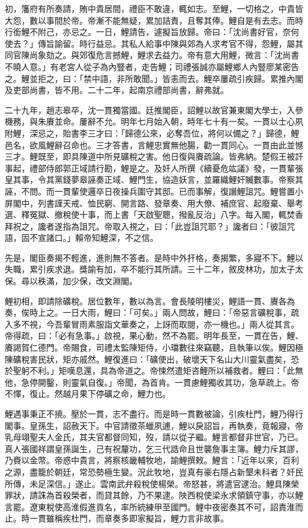 \begin{pinyinscope}
初，籓府有所奏請，賄中貴居間，禮臣不敢違，輒如志。至鯉，一切格之，中貴皆大怨，數以事間於帝。帝漸不能無疑，累加詰責，且奪其俸。鯉自是有去志。而時行銜鯉不附己，亦忌之。一日，鯉請告，遽擬旨放歸。帝曰：「沈尚書好官，奈何使去？」傳旨諭留。時行益忌。其私人給事中陳與郊為人求考官不得，怨鯉，屬其同官陳尚象劾之。與郊復危言撼鯉，鯉求去益力。帝有意大用鯉，微言：「沈尚書不曉人意。」有老宮人從子為內豎者，走告鯉；司禮張誠亦屬鯉鄉人內豎廖某密告之。鯉並拒之，曰：「禁中語，非所敢聞。」皆恚而去。鯉卒屢疏引疾歸。累推內閣及吏部尚書，皆不用。二十二年，起南京禮部尚書，辭弗就。

二十九年，趙志皋卒，沈一貫獨當國。廷推閣臣，詔鯉以故官兼東閣大學士，入參機務，與朱賡並命。屢辭不允。明年七月始入朝，時年七十有一矣。一貫以士心夙附鯉，深忌之，貽書李三才曰：「歸德公來，必奪吾位，將何以備之？」歸德，鯉邑名，欲風鯉辭召命也。三才答書，言鯉忠實無他腸，勸一貫同心。一貫由此並憾三才。鯉既至，即具陳道中所見礦稅之害。他日復與賡疏論。皆弗納。楚假王被訐事起，禮部侍郎郭正域請行勘，鯉是之。及奸人所撰《續憂危竑議》發，一貫輩張皇其事，令其黨錢夢皋誣奏正域、鯉門生，協造妖言，並羅織鯉奸贓數事。帝察其誣，不問。而一貫輩使邏卒日夜操兵圍守其邸。已而事解，復譖鯉詛咒。鯉嘗置小屏閣中，列書謹天戒、恤民窮、開言路、發章奏、用大僚、補庶官、起廢棄、舉考選、釋冤獄、撤稅使十事，而上書「天啟聖聰，撥亂反治」八字。每入閣，輒焚香拜祝之，讒者遂指為詛咒。帝取入視之，曰：「此豈詛咒耶？」讒者曰：「彼詛咒語，固不宣諸口。」賴帝知鯉深，不之信。

先是，閣臣奏揭不輕進，進則無不答者。是時中外扞格，奏揭繁，多寢不下。鯉以失職，累引疾求退。獎諭有加，卒不能行其所請。三十二年，敘皮林功，加太子太保。尋以秩滿，加少保，改文淵閣。

鯉初相，即請除礦稅。居位數年，數以為言。會長陵明樓災，鯉語一貫、賡各為奏，俟時上之。一日大雨，鯉曰：「可矣。」兩人問故，鯉曰：「帝惡言礦稅事，疏入多不視，今吾輩冒雨素服詣文華奏之，上訝而取閱，亦一機也。」兩人從其言。帝得疏，曰：「必有急事。」啟視，果心動，然不為罷。明年長至，一貫在告，鯉、賡謁賀仁德門。帝賜食，司禮太監陳矩侍，小璫數往來竊聽，且執筆以俟。鯉因極陳礦稅害民狀，矩亦戚然。鯉復進曰：「礦使出，破壞天下名山大川靈氣盡矣，恐於聖躬不利。」矩嘆息還，具為帝道之。帝悚然遣矩咨鯉所以補救者。鯉曰：「此無他，急停開鑿，則靈氣自復。」帝聞，為首肯。一貫慮鯉獨收其功，急草疏上。帝不懌，復止。然越月果下停礦之命，鯉力也。

鯉遇事秉正不撓。壓於一貫，志不盡行。而是時一貫數被論，引疾杜門，鯉乃得行閣事。皇孫生，詔赦天下。中官請徵茶蠟夙逋，鯉以戾詔旨，再執奏，竟報寢，帝乳母翊聖夫人金氏，其夫官都督同知，歿，請以從子繼。鯉言都督非世官，乃已。真人張國祥謂皇孫誕生，己有祝釐功，乞三代誥命且世襲詹事主簿。鯉力斥其謬，乃賚以金幣。帝惑中貴言，將察核畿輔牧地，諭鯉撰敕。鯉言：「近年以來，百利之源，盡籠於朝廷，常恐勢極生變。況此牧地，豈真有豪右隱占新墾未科者？奸民所傳，未足深信。」遂止。雲南武弁殺稅使楊榮。帝怒甚，將遣官逮治。鯉具陳榮罪狀，請誅為首殺榮者，而貸其餘，乃不果逮。陜西稅使梁永求領鎮守事，亦以鯉言罷。遼東稅使高淮假進貢名，率所統練甲至國門。鯉中夜密奏其不可，詔責淮而止。時一貫雖稱疾杜門，而章奏多即家擬旨，鯉力言非故事。


\end{pinyinscope}
